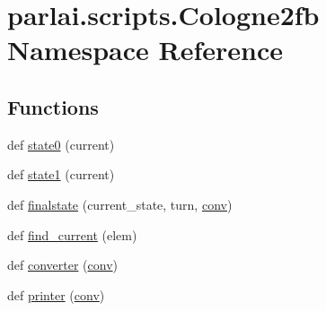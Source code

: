 \hypertarget{namespaceparlai_1_1scripts_1_1Cologne2fb}{}\section{parlai.\+scripts.\+Cologne2fb Namespace Reference}
\label{namespaceparlai_1_1scripts_1_1Cologne2fb}
\subsection*{Functions}
\begin{DoxyCompactItemize}
\item 
def \hyperlink{namespaceparlai_1_1scripts_1_1Cologne2fb_ac765067cc58a95632761e7cf25d552ca}{state0} (current)
\item 
def \hyperlink{namespaceparlai_1_1scripts_1_1Cologne2fb_a54d10b54a93975b9903bd789aa2b5b91}{state1} (current)
\item 
def \hyperlink{namespaceparlai_1_1scripts_1_1Cologne2fb_afdd76596097051e6d1580703a4f2abe8}{finalstate} (current\+\_\+state, turn, \hyperlink{namespaceparlai_1_1scripts_1_1Cologne2fb_a9cdaab7c6b5d02bcf42de03da00fa817}{conv})
\item 
def \hyperlink{namespaceparlai_1_1scripts_1_1Cologne2fb_a0769ed4e08e090e651516d1c4dd50b39}{find\+\_\+current} (elem)
\item 
def \hyperlink{namespaceparlai_1_1scripts_1_1Cologne2fb_a1600997b7fde85c597ea9ec986997276}{converter} (\hyperlink{namespaceparlai_1_1scripts_1_1Cologne2fb_a9cdaab7c6b5d02bcf42de03da00fa817}{conv})
\item 
def \hyperlink{namespaceparlai_1_1scripts_1_1Cologne2fb_aada34019571fe1ff9ae0a5fc8bf03c67}{printer} (\hyperlink{namespaceparlai_1_1scripts_1_1Cologne2fb_a9cdaab7c6b5d02bcf42de03da00fa817}{conv})
\end{DoxyCompactItemize}
